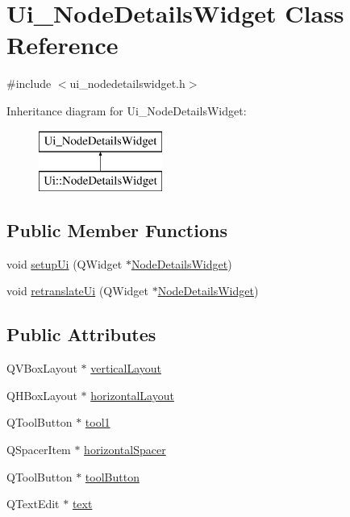 \hypertarget{class_ui___node_details_widget}{}\section{Ui\+\_\+\+Node\+Details\+Widget Class Reference}
\label{class_ui___node_details_widget}


{\ttfamily \#include $<$ui\+\_\+nodedetailswidget.\+h$>$}

Inheritance diagram for Ui\+\_\+\+Node\+Details\+Widget\+:\begin{figure}[H]
\begin{center}
\leavevmode
\includegraphics[height=2.000000cm]{d9/d53/class_ui___node_details_widget}
\end{center}
\end{figure}
\subsection*{Public Member Functions}
\begin{DoxyCompactItemize}
\item 
void \mbox{\hyperlink{class_ui___node_details_widget_aed8a2ceb9cbfd0f3e41009fbf3ab0f11}{setup\+Ui}} (Q\+Widget $\ast$\mbox{\hyperlink{class_node_details_widget}{Node\+Details\+Widget}})
\item 
void \mbox{\hyperlink{class_ui___node_details_widget_a5a33ec1445be8aac3d91ba68e6eab4b4}{retranslate\+Ui}} (Q\+Widget $\ast$\mbox{\hyperlink{class_node_details_widget}{Node\+Details\+Widget}})
\end{DoxyCompactItemize}
\subsection*{Public Attributes}
\begin{DoxyCompactItemize}
\item 
Q\+V\+Box\+Layout $\ast$ \mbox{\hyperlink{class_ui___node_details_widget_a980304a66073bba134ef50aa75d18449}{vertical\+Layout}}
\item 
Q\+H\+Box\+Layout $\ast$ \mbox{\hyperlink{class_ui___node_details_widget_a42862f0b7f9c5c64532619022403e642}{horizontal\+Layout}}
\item 
Q\+Tool\+Button $\ast$ \mbox{\hyperlink{class_ui___node_details_widget_a9856d88cd0affab427e9d13d6b8493cf}{tool1}}
\item 
Q\+Spacer\+Item $\ast$ \mbox{\hyperlink{class_ui___node_details_widget_ae8b6a6078c30a5aeaac7c9fef92cd9b8}{horizontal\+Spacer}}
\item 
Q\+Tool\+Button $\ast$ \mbox{\hyperlink{class_ui___node_details_widget_a7a2d9b0a2d978972dc99d512c8527779}{tool\+Button}}
\item 
Q\+Text\+Edit $\ast$ \mbox{\hyperlink{class_ui___node_details_widget_a16a82592242f130d906b933a44a61bb8}{text}}
\end{DoxyCompactItemize}


